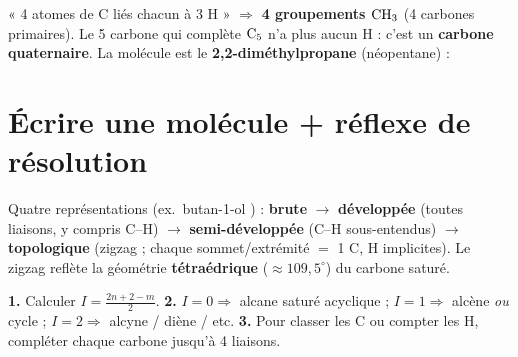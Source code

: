 \documentclass[11pt,a4paper]{article}
\providecommand{\degree}{^\circ}
\begin{document}
\begin{exmp}
« 4 atomes de C liés chacun à 3 H » $\Rightarrow$ \textbf{4 groupements $\ce{CH3}$} (4 carbones primaires). Le 5 carbone qui complète $\ce{C5}$ n'a plus aucun H : c'est un \textbf{carbone quaternaire}. La molécule est le \textbf{2,2-diméthylpropane} (néopentane) : 
\end{exmp}

\section{Écrire une molécule + réflexe de résolution}
Quatre représentations (ex.\ butan-1-ol ) : \textbf{brute}  $\to$ \textbf{développée} (toutes liaisons, y compris C--H) $\to$ \textbf{semi-développée}  (C--H sous-entendus) $\to$ \textbf{topologique}  (zigzag ; chaque sommet/extrémité $=$ 1 C, H implicites). Le zigzag reflète la géométrie \textbf{tétraédrique} ($\approx 109{,}5\degree$) du carbone saturé.

\begin{astuce}
\textbf{1.} Calculer $I=\frac{2n+2-m}{2}$. \textbf{2.} $I{=}0\Rightarrow$ alcane saturé acyclique ; $I{=}1\Rightarrow$ alcène \emph{ou} cycle ; $I{=}2\Rightarrow$ alcyne / diène / etc. \textbf{3.} Pour classer les C ou compter les H, compléter chaque carbone jusqu'à 4 liaisons.
\end{astuce}
\end{document}
